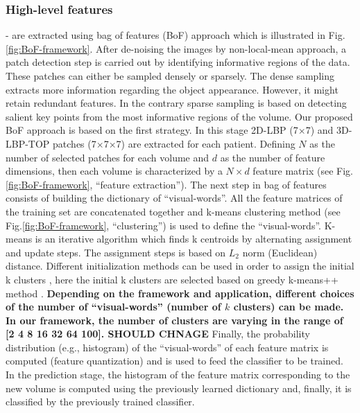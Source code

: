 \subsubsection{High-level features} - are extracted using bag of features (BoF) approach which is illustrated in Fig. \ref{fig:BoF-framework}. After de-noising the images by non-local-mean approach, a patch detection step is carried out by identifying informative regions of the data. These patches can either be sampled densely or sparsely. The dense sampling extracts more information regarding the object appearance. However, it might retain redundant features. In the contrary sparse sampling is based on detecting salient key points from the most informative regions of the volume. Our proposed BoF approach is based on the first strategy. In this stage 2D-LBP (7$\times$7) and 3D-LBP-TOP patches (7$\times$7$\times$7) are extracted for each patient. Defining $N$ as the number of selected patches for each volume and $d$ as the number of feature dimensions, then each volume is characterized by a $N \times d$ feature matrix (see Fig. \ref{fig:BoF-framework}, ``feature extraction''). The next step in bag of features consists of building the dictionary of ``visual-words''. All the feature matrices of the training set are concatenated together and k-means clustering method (see Fig.\ref{fig:BoF-framework}, ``clustering'') is used to define the ``visual-words''. K-means is an iterative algorithm which finds k centroids by alternating assignment and update steps. The assignment steps is based on $L_{2}$ norm (Euclidean) distance. Different initialization methods can be used in order to assign the initial k clusters \cite {celebi2013comparative}, here the initial k clusters are selected based on greedy k-means++ method \cite{arthur2007k}. \textbf{Depending on the framework and application, different choices of the number of ``visual-words'' (number of $k$ clusters) can be made. In our framework, the number of clusters are varying in the range of [2 4 8 16 32 64 100]. SHOULD CHNAGE} Finally, the probability distribution (e.g., histogram) of the ``visual-words'' of each feature matrix is computed (feature quantization) and is used to feed the classifier to be trained. In the prediction stage, the histogram of the feature matrix corresponding to the new volume is computed using the previously learned dictionary and, finally, it is classified by the previously trained classifier.\\




